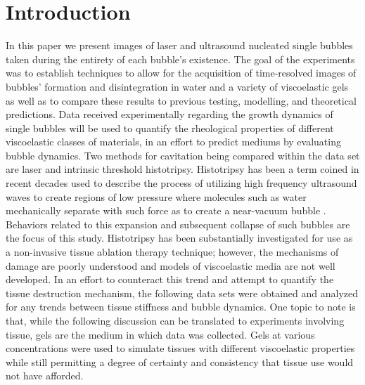 \documentclass[prl,aps,epsf,twocolumn,superscriptaddress]{revtex4-1}
\begin{document}
\section{Introduction}
In this paper we present images of laser and ultrasound nucleated single bubbles taken during the entirety of each bubble's existence. The goal of the experiments was to establish techniques to allow for the acquisition of time-resolved images of bubbles' formation and disintegration in water and a variety of viscoelastic gels as well as to compare these results to previous testing, modelling, and theoretical predictions. Data received experimentally regarding the growth dynamics of single bubbles will be used to quantify the rheological properties of different viscoelastic classes of materials, in an effort to predict mediums by evaluating bubble dynamics. Two methods for cavitation being compared within the data set are laser and intrinsic threshold histotripsy. Histotripsy has been a term coined in recent decades used to describe the process of utilizing high frequency ultrasound waves to create regions of low pressure where molecules such as water mechanically separate with such force as to create a near-vacuum bubble \cite{maxwell2013probability}. Behaviors related to this expansion and subsequent collapse of such bubbles are the focus of this study. Histotripsy has been substantially investigated for use as a non-invasive tissue ablation therapy technique; however, the mechanisms of damage are poorly understood and models of viscoelastic media are not well developed. In an effort to counteract this trend and attempt to quantify the tissue destruction mechanism, the following data sets were obtained and analyzed for any trends between tissue stiffness and bubble dynamics. One topic to note is that, while the following discussion can be translated to experiments involving tissue, gels are the medium in which data was collected. Gels at various concentrations were used to simulate tissues with different viscoelastic properties while still permitting a degree of certainty and consistency that tissue use would not have afforded.

\end{document}
